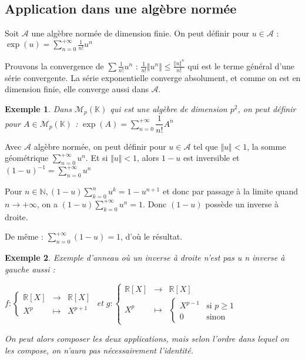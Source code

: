 \documentclass[a4paper,12pt]{book}
\newcommand{\Prop}[2]{\begin{tcolorbox}[sharp corners, colback=white,colframe=red!90!black!75, title=Proposition : #1]#2\end{tcolorbox}}
\newcommand{\Pre}[1]{\begin{tcolorbox}[sharp corners, colback=white,colframe=green!60!green!30!black!75, title=Preuve]#1\end{tcolorbox}}
\newtheorem{Exe}{Exemple}[section]
\def\R{\mathbb{R}}
\def\N{\mathbb{N}}
\def\K{\mathbb{K}}
\begin{document}
\subsection{Application dans une algèbre normée}
\Prop{Série exponentielle}{Soit $\mathcal{A}$ une algèbre normée de dimension finie. On peut définir pour $u\in\mathcal{A}$ : $\exp(u) = \sum\limits_{n=0}^{+\infty}\frac{1}{n!}u^n$}
\Pre{Prouvons la convergence de $\sum \frac{1}{n!}u^n$ : $\frac{1}{n!}\Vert u^n\Vert\leq \frac{\Vert u\Vert^n}{n!}$ qui est le terme général d'une série convergente. La série exponentielle converge absolument, et comme on est en dimension finie, elle converge aussi dans $\mathcal{A}$.}
\begin{Exe}
Dans $\mathcal{M}_p(\K)$ qui est une algèbre de dimension $p^2$, on peut définir pour $A\in\mathcal{M}_p(\K)$ : $\exp(A)=\sum\limits_{n=0}^{+\infty}\dfrac{1}{n!}A^n$
\end{Exe}
\Prop{Série géométrique}{Avec $\mathcal{A}$ algèbre normée, on peut définir pour $u\in\mathcal{A}$ tel que $\Vert u\Vert < 1$, la somme géométrique $\sum\limits_{n=0}^{+\infty}u^n$. Et si $\Vert u\Vert<1$, alors $1-u$ est inversible et $(1-u)^{-1}=\sum\limits_{n=0}^{+\infty}u^n$}
\Pre{Pour $n\in\N, (1-u)\sum\limits_{k=0}^nu^k = 1-u^{n+1}$ et donc par passage à la limite quand $n\to+\infty$, on a $(1-u)\sum\limits_{k=0}^{+\infty}u^n=1$. Donc $(1-u)$ possède un inverse à droite.
\par De même : $\sum\limits_{n=0}^{+\infty}(1-u)=1$, d'où le résultat.}
\begin{Exe}
Exemple d'anneau où un inverse à droite n'est pas u n inverse à gauche aussi : 
\par $f:\left\{\begin{array}{rcl}\R[X]&\to&\R[X] \\ X^p & \mapsto & X^{p+1}\end{array}\right.$ et $g:\left\{\begin{array}{rcl}\R[X]&\to&\R[X] \\ X^p & \mapsto & \left\{\begin{array}{cl}X^{p-1} & \text{si $p\geq 1$} \\ 0 & \text{sinon}\end{array}\right.\end{array}\right.$
\par On peut alors composer les deux applications, mais selon l'ordre dans lequel on les compose, on n'aura pas nécessairement l'identité.
\end{Exe}
\end{document}
